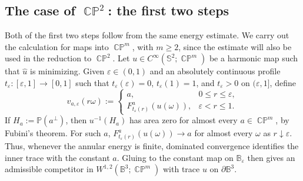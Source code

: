 \documentclass[11pt]{article}
\theoremstyle{plain}
\numberwithin{equation}{section}
\theoremstyle{definition}
\def \mb{\mathbb}
\DeclareMathOperator{\CP}{\mathbb{CP}}
\begin{document}
\subsection{The case of \texorpdfstring{$\CP^2$}{CP2}: the first two steps}

Both of the first two steps follow from the same energy estimate. We carry out the calculation for maps into $\CP^m$, with $m\geq2$, since
the estimate will also be used in the reduction to $\CP^2$.
Let $u\in C^\infty(\mb S^2;\CP^m)$ be a harmonic map such that $\hat u$
is minimizing.  Given $\varepsilon\in(0,1)$ and an absolutely continuous
profile $t_\varepsilon\colon[\varepsilon,1]\to[0,1]$ such that
$t_\varepsilon(\varepsilon)=0$, $t_\varepsilon(1)=1$, and
$t_\varepsilon>0$ on $(\varepsilon,1]$, define
\begin{equation}
    \label{eq:competitorCP2}
    v_{a,\varepsilon}(r\omega):=
    \begin{cases}
        a,&0\leq r\leq\varepsilon,\\
        F_{t_\varepsilon(r)}^a(u(\omega)),&\varepsilon<r\leq1.
    \end{cases}
\end{equation}
If $H_a:=\mb P(a^\perp)$, then $u^{-1}(H_a)$ has area zero for almost
every $a\in\CP^m$, by Fubini's theorem.  For such $a$,
$F_{t_\varepsilon(r)}^a(u(\omega))\to a$ for almost every $\omega$ as
$r\downarrow\varepsilon$.  Thus, whenever the annular energy is finite,
dominated convergence identifies the inner trace with the constant $a$.
Gluing to the constant map on $\mb B_\varepsilon$ then gives an admissible
competitor in $W^{1,2}(\mb B^3;\CP^m)$ with trace $u$ on
$\partial\mb B^3$.
\end{document}
